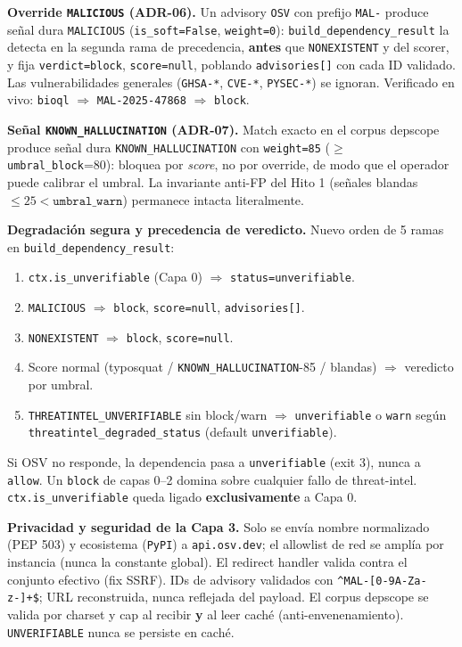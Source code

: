\documentclass[11pt,a4paper]{article}
\begin{document}
\medskip
\noindent\textbf{Override \texttt{MALICIOUS} (ADR-06).} Un advisory \texttt{OSV} con
prefijo \texttt{MAL-} produce señal dura \texttt{MALICIOUS} (\texttt{is\_soft=False},
\texttt{weight=0}): \texttt{build\_dependency\_result} la detecta en la segunda rama
de precedencia, \textbf{antes} que \texttt{NONEXISTENT} y del scorer, y fija
\texttt{verdict=block}, \texttt{score=null}, poblando \texttt{advisories[]} con cada
ID validado. Las vulnerabilidades generales (\texttt{GHSA-*}, \texttt{CVE-*},
\texttt{PYSEC-*}) se ignoran. Verificado en vivo: \texttt{bioql} $\Rightarrow$
\texttt{MAL-2025-47868} $\Rightarrow$ \texttt{block}.

\medskip
\noindent\textbf{Señal \texttt{KNOWN\_HALLUCINATION} (ADR-07).} Match exacto en el corpus
depscope produce señal dura \texttt{KNOWN\_HALLUCINATION} con \texttt{weight=85}
($\ge$ \texttt{umbral\_block}=80): bloquea por \emph{score}, no por override, de modo
que el operador puede calibrar el umbral. La invariante anti-FP del Hito 1 (señales blandas
$\le 25 < \texttt{umbral\_warn}$) permanece intacta literalmente.

\medskip
\noindent\textbf{Degradación segura y precedencia de veredicto.}
Nuevo orden de 5 ramas en \texttt{build\_dependency\_result}:
\begin{enumerate}[nosep]
  \item \texttt{ctx.is\_unverifiable} (Capa 0) $\Rightarrow$ \texttt{status=unverifiable}.
  \item \texttt{MALICIOUS} $\Rightarrow$ \texttt{block}, \texttt{score=null}, \texttt{advisories[]}.
  \item \texttt{NONEXISTENT} $\Rightarrow$ \texttt{block}, \texttt{score=null}.
  \item Score normal (typosquat / \texttt{KNOWN\_HALLUCINATION}-85 / blandas) $\Rightarrow$ veredicto por umbral.
  \item \texttt{THREATINTEL\_UNVERIFIABLE} sin block/warn $\Rightarrow$ \texttt{unverifiable} o \texttt{warn}
        según \texttt{threatintel\_degraded\_status} (default \texttt{unverifiable}).
\end{enumerate}
Si OSV no responde, la dependencia pasa a \texttt{unverifiable} (exit 3), nunca a
\texttt{allow}. Un \texttt{block} de capas 0--2 domina sobre cualquier fallo de
threat-intel. \texttt{ctx.is\_unverifiable} queda ligado \textbf{exclusivamente} a Capa 0.

\medskip
\noindent\textbf{Privacidad y seguridad de la Capa 3.}
Solo se envía nombre normalizado (PEP 503) y ecosistema (\texttt{PyPI}) a
\texttt{api.osv.dev}; el allowlist de red se amplía por instancia (nunca la constante global).
El redirect handler valida contra el conjunto efectivo (fix SSRF). IDs de advisory validados
con \texttt{\^{}MAL-[0-9A-Za-z-]+\$}; URL reconstruida, nunca reflejada del payload. El
corpus depscope se valida por charset y cap al recibir \textbf{y} al leer caché
(anti-envenenamiento). \texttt{UNVERIFIABLE} nunca se persiste en caché.
\end{document}
